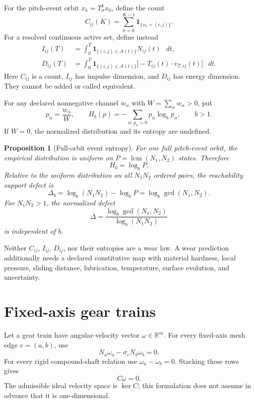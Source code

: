 \documentclass[11pt,a4paper]{article}
\theoremstyle{definition}
\theoremstyle{plain}
\newtheorem{proposition}[definition]{Proposition}
\theoremstyle{remark}
\newcommand{\R}{\mathbb{R}}
\newcommand{\dd}{\mathop{}\!d}
\newcommand{\Acal}{\mathcal A}
\begin{document}
For the pitch-event orbit \(x_k=T_\sigma^kx_0\), define the count
\[
C_{ij}(K)
=\sum_{k=0}^{K-1}\mathbf 1_{\{x_k=(i,j)\}}.
\]
For a resolved continuous active set, define instead
\begin{align}
I_{ij}(T)
&=\int_0^T
\mathbf 1_{\{(i,j)\in\Acal(t)\}}N_{ij}(t)\,\dd t,
\label{eq:normal-exposure}\\
D_{ij}(T)
&=\int_0^T
\mathbf 1_{\{(i,j)\in\Acal(t)\}}
\bigl[-T_{ij}(t)\cdot v_{T,ij}(t)\bigr]\,\dd t.
\label{eq:dissipative-exposure}
\end{align}
Here \(C_{ij}\) is a count, \(I_{ij}\) has impulse dimension, and
\(D_{ij}\) has energy dimension. They cannot be added or called
equivalent.

For any declared nonnegative channel \(w_\alpha\) with
\(W=\sum_\alpha w_\alpha>0\), put
\[
p_\alpha=\frac{w_\alpha}{W},\qquad
H_b(p)=-\sum_{\alpha:p_\alpha>0}p_\alpha\log_b p_\alpha,
\qquad b>1.
\]
If \(W=0\), the normalized distribution and its entropy are
undefined.

\begin{proposition}[Full-orbit event entropy]
For one full pitch-event orbit, the empirical distribution is uniform
on \(P=\operatorname{lcm}(N_1,N_2)\) states. Therefore
\[
H_b=\log_bP.
\]
Relative to the uniform distribution on all \(N_1N_2\) ordered pairs,
the reachability support defect is
\begin{equation}\label{eq:reachability-defect}
\Delta_b
=\log_b(N_1N_2)-\log_bP
=\log_b\gcd(N_1,N_2).
\end{equation}
For \(N_1N_2>1\), the normalized defect
\[
\overline\Delta
=\frac{\log_b\gcd(N_1,N_2)}{\log_b(N_1N_2)}
\]
is independent of \(b\).
\end{proposition}

Neither \(C_{ij}\), \(I_{ij}\), \(D_{ij}\), nor their entropies are a
wear law. A wear prediction additionally needs a declared
constitutive map with material hardness, local pressure, sliding
distance, lubrication, temperature, surface evolution, and
uncertainty.

\section{Fixed-axis gear trains}

Let a gear train have angular-velocity vector
\(\omega\in\R^m\). For every fixed-axis mesh edge \(e=(a,b)\), use
\[
N_a\omega_a-\sigma_eN_b\omega_b=0.
\]
For every rigid compound-shaft relation use
\(\omega_a-\omega_b=0\). Stacking these rows gives
\begin{equation}\label{eq:train-kernel}
C\omega=0.
\end{equation}
The admissible ideal velocity space is \(\ker C\); this formulation
does not assume in advance that it is one-dimensional.
\end{document}
